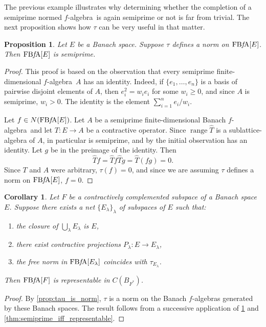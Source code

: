 \documentclass{memo-l}
\newtheorem{prop}[theorem]{Proposition}
\newtheorem{cor}[theorem]{Corollary}
\theoremstyle{definition}
\theoremstyle{remark}
\numberwithin{section}{chapter}
\numberwithin{equation}{chapter}
\newcommand{\falg}{$f\!$-algebra}
\newcommand{\FBFA}[1]{\operatorname{FB{\it f}\!A}[#1]}
\DeclareMathOperator{\range}{range}
\begin{document}
The previous example illustrates why determining whether the
completion of a semiprime normed \falg\ is again semiprime or not is far
from trivial. The next proposition shows how $\tau $ can be very
useful in that matter.

\begin{prop}\label{prop:tau_norm_implies_semiprime}
    Let $E$ be a Banach space. Suppose $\tau $ defines a norm on $\FBFA E$. Then $\FBFA E$ is semiprime.
\end{prop}
\begin{proof}
    This proof is based on the observation that every semiprime
    finite-dimensional \falg\ $A$ has an
    identity. Indeed, if $\{e_1,\ldots ,e_n\}$ is a basis of pairwise
    disjoint elements of $A$, then $e_i^2=w_ie_i$ for some $w_i\ge 0$,
    and since $A$ is semiprime, $w_i>0$. The identity is
    the element $\sum_{i=1}^{n} e_i/w_i$.

    Let $f \in N(\FBFA E)$. Let $A$ be a semiprime finite-dimensional Banach
    \falg\ and let $T\colon E\to A$ be a
    contractive operator. Since $\range \hat{T}$ is a
    sublattice-algebra of $A$, in particular is semiprime,
    and by the initial observation has an identity. Let $g$ be in the
    preimage of the identity. Then
    \[
    \hat{T}f=\hat{T}f \hat{T}g=\hat{T}(fg)=0.
    \]
    Since $T$ and $A$ were arbitrary, $\tau   (f)=0$, and since we are
    assuming $\tau $ defines a norm on $\FBFA E$, $f=0$.
\end{proof}

\begin{cor}\label{cor:representable_examples}
    Let $F$ be a contractively complemented subspace of a Banach space $E$. Suppose
    there exists a net $\{E_\lambda \}_\lambda $ of
    subspaces of $E$ such that:
    \begin{enumerate}
        \item the closure of $\bigcup_{\lambda}E_\lambda $ is $E$,
        \item there exist contractive projections $P_\lambda \colon
        E\to E_\lambda $,
        \item the free norm in $\FBFA{E_\lambda }$ coincides with $\tau
        _{E_\lambda }$.
    \end{enumerate}
    Then $\FBFA F$ is representable in $C(B_{F^{*}})$.
\end{cor}
\begin{proof}
    By \cref{prop:tau_is_norm}, $\tau $ is a
    norm on the Banach \falg s generated by these Banach spaces. The
    result follows from a successive application of
    \cref{prop:tau_norm_implies_semiprime} and
    \cref{thm:semiprime_iff_representable}.
\end{proof}
\end{document}
